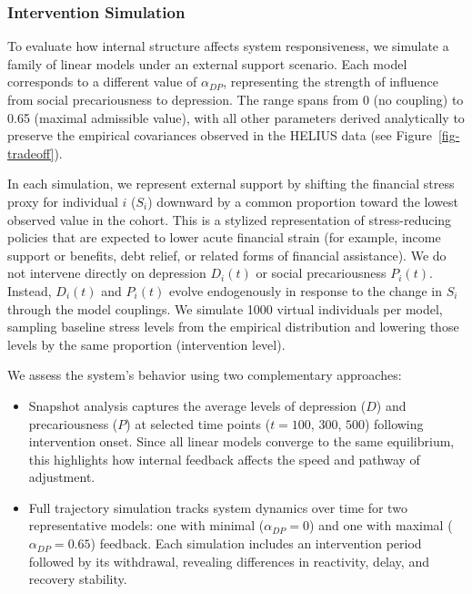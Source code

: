\documentclass[
]{article}
\begin{document}
\subsubsection{Intervention Simulation}\label{intervention-simulation}

To evaluate how internal structure affects system responsiveness, we
simulate a family of linear models under an external support scenario.
Each model corresponds to a different value of \(\alpha_{DP}\),
representing the strength of influence from social precariousness to
depression. The range spans from 0 (no coupling) to 0.65 (maximal
admissible value), with all other parameters derived analytically to
preserve the empirical covariances observed in the HELIUS data (see
Figure~\ref{fig-tradeoff}).

\textcolor{BrickRed}{In each simulation, we represent external support by shifting the financial stress proxy for individual $i$ ($S_i$) downward by a common proportion toward the lowest observed value in the cohort. This is a stylized representation of stress-reducing policies that are expected to lower acute financial strain (for example, income support or benefits, debt relief, or related forms of financial assistance). We do not intervene directly on depression $D_i(t)$ or social precariousness $P_i(t)$. Instead, $D_i(t)$ and $P_i(t)$ evolve endogenously in response to the change in $S_i$ through the model couplings. We simulate 1000 virtual individuals per model, sampling baseline stress levels from the empirical distribution and lowering those levels by the same proportion (intervention level).}

We assess the system's behavior using two complementary approaches:

\begin{itemize}
\item
  Snapshot analysis captures the average levels of depression (\(D\))
  and precariousness (\(P\)) at selected time points (\(t = 100\),
  \(300\), \(500\)) following intervention onset. Since all linear
  models converge to the same equilibrium, this highlights how internal
  feedback affects the speed and pathway of adjustment.
\item
  Full trajectory simulation tracks system dynamics over time for two
  representative models: one with minimal (\(\alpha_{DP} = 0\)) and one
  with maximal (\(\alpha_{DP} = 0.65\)) feedback. Each simulation
  includes an intervention period followed by its withdrawal, revealing
  differences in reactivity, delay, and recovery stability.
\end{itemize}
\end{document}
